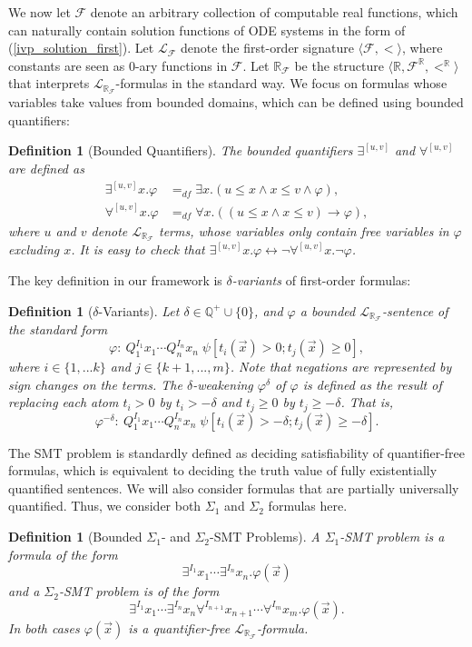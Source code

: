 \documentclass[12pt]{article}
\newtheorem{definition}[theorem]{Definition}
\newcommand{\lrf}{\mathcal{L}_{\mathbb{R}_{\mathcal{F}}}}
\begin{document}
We now let $\mathcal{F}$ denote an arbitrary collection of computable real functions, which can naturally contain solution functions of ODE systems in the form of (\ref{ivp_solution_first}). Let $\mathcal{L}_{\mathcal{F}}$ denote the first-order signature $\langle \mathcal{F}, <\rangle$, where constants are seen as 0-ary functions in $\mathcal{F}$. Let $\mathbb{R}_{\mathcal{F}}$ be the  structure $\langle \mathbb{R}, \mathcal{F}^{\mathbb{R}}, <^{\mathbb{R}}\rangle$ that interprets $\lrf$-formulas in the standard way. We focus on formulas whose variables take values from bounded domains, which can be defined using bounded quantifiers:
\begin{definition}[Bounded Quantifiers]
The bounded quantifiers $\exists^{[u,v]}$ and $\forall^{[u,v]}$ are defined as
\begin{align*}
\exists^{[u,v]}x.\varphi &=_{df}\exists x. ( u \leq x \land x \leq v \wedge
\varphi),\\
\forall^{[u,v]}x.\varphi &=_{df} \forall x. ( (u \leq x \land x \leq v)
\rightarrow \varphi),
\end{align*}
where $u$ and $v$ denote $\lrf$ terms, whose variables only
contain free variables in $\varphi$ excluding $x$. It is easy to check that
$\exists^{[u,v]}x. \varphi \leftrightarrow \neg \forall^{[u,v]}x. \neg\varphi$.
\end{definition}
The key definition in our framework is {\em $\delta$-variants} of first-order formulas: 
\begin{definition}[$\delta$-Variants]\label{variants}
Let $\delta\in \mathbb{Q}^+\cup\{0\}$, and $\varphi$ a bounded
$\lrf$-sentence of the standard form
$$\varphi: \ Q_1^{I_1}x_1\cdots Q_n^{I_n}x_n\;\psi[t_i(\vec x)>0;
t_j(\vec x)\geq 0],$$ where $i\in\{1,...k\}$ and $j\in\{k+1,...,m\}$.  Note that negations are represented by sign changes on the terms. The {\em
$\delta$-weakening} $\varphi^{\delta}$ of $\varphi$ is
defined as the result of replacing each atom $t_i > 0$ by $t_i >
-\delta$ and $t_j \geq 0$ by $t_j \geq -\delta$. That is,
$$\varphi^{-\delta}:\ Q_1^{I_1}x_1\cdots Q_n^{I_n}x_n\;\psi[t_i(\vec x)>-\delta; t_j(\vec x)\geq -\delta].$$
\end{definition}
The SMT problem is standardly defined as deciding satisfiability of quantifier-free formulas, which is equivalent to deciding the truth value of fully existentially quantified sentences. We will also consider formulas that are partially universally quantified. Thus, we consider both $\Sigma_1$ and $\Sigma_2$ formulas here.
\begin{definition}[Bounded $\Sigma_1$- and $\Sigma_2$-SMT Problems]
A $\Sigma_1$-SMT problem is a formula of the form
$$\exists^{I_1}x_1\cdots\exists^{I_n}x_n.\varphi(\vec x)$$
and a $\Sigma_2$-SMT problem is of the form
$$\exists^{I_1}x_1\cdots\exists^{I_n}x_n\forall^{I_{n+1}}x_{n+1}\cdots\forall^{I_{m}}x_m.\varphi(\vec x).$$
In both cases $\varphi(\vec x)$ is a quantifier-free $\lrf$-formula.
\end{definition}
\end{document}
